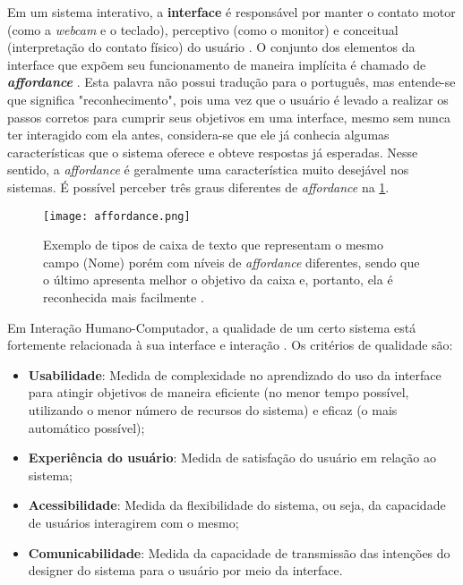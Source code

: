 \indent Em um sistema interativo, a \textbf{interface} é responsável por manter o contato motor (como a \textit{webcam} e o teclado), perceptivo (como o monitor) e conceitual (interpretação do contato físico) do usuário \cite[p. 25]{IHCbook}. O conjunto dos elementos da interface que expõem seu funcionamento de maneira implícita é chamado de \textbf{\textit{affordance}} \cite[p. 27]{IHCbook}. Esta palavra não possui tradução para o português, mas entende-se que significa "reconhecimento", pois uma vez que o usuário é levado a realizar os passos corretos para cumprir seus objetivos em uma interface, mesmo sem nunca ter interagido com ela antes, considera-se que ele já conhecia algumas características que o sistema oferece e obteve respostas já esperadas. Nesse sentido, a \textit{affordance} é geralmente uma característica muito desejável nos sistemas. É possível perceber três graus diferentes de \textit{affordance} na \ref{fig:Affordance}.

\begin{figure}[!h]
    \centering
    \texttt{[image: affordance.png]}
    \caption{Exemplo de tipos de caixa de texto que representam o mesmo campo (Nome) porém com níveis de \textit{affordance} diferentes, sendo que o último apresenta melhor o objetivo da caixa e, portanto, ela é reconhecida mais facilmente \cite{affordance}.}
    \label{fig:Affordance}
\end{figure} 

\indent Em Interação Humano-Computador, a qualidade de um certo sistema está fortemente relacionada à sua interface e interação \cite[p. 28]{IHCbook}. Os critérios de qualidade são:
\begin{itemize}
\item[1] \textbf{Usabilidade}: Medida de complexidade no aprendizado do uso da interface para atingir objetivos de maneira eficiente (no menor tempo possível, utilizando o menor número de recursos do sistema) e eficaz (o mais automático possível);
\item[2] \textbf{Experiência do usuário}: Medida de satisfação do usuário em relação ao sistema;
\item[3] \textbf{Acessibilidade}: Medida da flexibilidade do sistema, ou seja, da capacidade de usuários interagirem com o mesmo;
\item[4] \textbf{Comunicabilidade}: Medida da capacidade de transmissão das intenções do designer do sistema para o usuário por meio da interface. %
\end{itemize}

